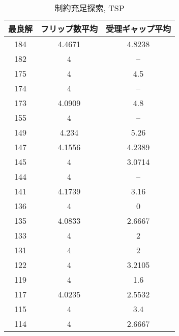 \begin{table}[htbp]
  \centering
  \caption{制約充足探索, TSP}
  \begin{tabular}{ccc}
    \hline
    最良解 & フリップ数平均 & 受理ギャップ平均 \\
    \hline
    184 & 4.4671  & 4.8238 \\
182 & 4       & --     \\
175 & 4       & 4.5    \\
174 & 4       & --     \\
173 & 4.0909  & 4.8    \\
155 & 4       & --     \\
149 & 4.234   & 5.26   \\
147 & 4.1556  & 4.2389 \\
145 & 4       & 3.0714 \\
144 & 4       & --     \\
141 & 4.1739  & 3.16   \\
136 & 4       & 0      \\
135 & 4.0833  & 2.6667 \\
133 & 4       & 2      \\
131 & 4       & 2      \\
122 & 4       & 3.2105 \\
119 & 4       & 1.6    \\
117 & 4.0235  & 2.5532 \\
115 & 4       & 3.4    \\
114 & 4       & 2.6667 \\
    \hline
  \end{tabular}
\end{table}

